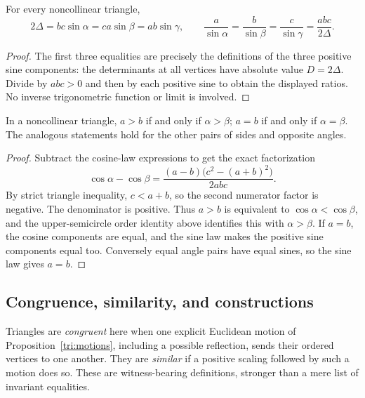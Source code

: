 \begin{theorem}
\label{tri:sine}
For every noncollinear triangle,
\[
 2\Delta=bc\sin\alpha=ca\sin\beta=ab\sin\gamma,
 \qquad
 \frac a{\sin\alpha}=\frac b{\sin\beta}
                      =\frac c{\sin\gamma}=\frac{abc}{2\Delta}.
\]
\end{theorem}
\begin{proof}
The first three equalities are precisely the definitions of the three
positive sine components: the determinants at all vertices have absolute
value $D=2\Delta$.  Divide by $abc>0$ and then by each positive sine to
obtain the displayed ratios.  No inverse trigonometric function or limit is
involved.
\end{proof}

\begin{theorem}
\label{tri:side-angle}
In a noncollinear triangle, $a>b$ if and only if $\alpha>\beta$;
$a=b$ if and only if $\alpha=\beta$.  The analogous statements hold for
the other pairs of sides and opposite angles.
\end{theorem}
\begin{proof}
Subtract the cosine-law expressions to get the exact factorization
\[
 \cos\alpha-\cos\beta
 =\frac{(a-b)\bigl(c^2-(a+b)^2\bigr)}{2abc}.
\]
By strict triangle inequality, $c<a+b$, so the second numerator factor is
negative.  The denominator is positive.  Thus $a>b$ is equivalent to
$\cos\alpha<\cos\beta$, and the upper-semicircle order identity above
identifies this with $\alpha>\beta$.  If $a=b$, the cosine components are
equal, and the sine law makes the positive sine components equal too.
Conversely equal angle pairs have equal sines, so the sine law gives $a=b$.
\end{proof}

\subsection{Congruence, similarity, and constructions}

Triangles are \emph{congruent} here when one explicit Euclidean motion of
Proposition~\ref{tri:motions}, including a possible reflection, sends their
ordered vertices to one another.  They are \emph{similar} if a positive
scaling followed by such a motion does so.  These are witness-bearing
definitions, stronger than a mere list of invariant equalities.

